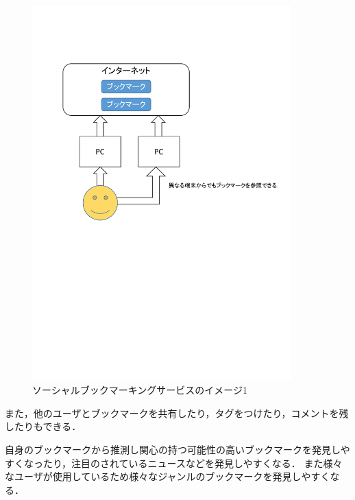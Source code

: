 \begin{figure}[htb]
\centering
\includegraphics[width=10cm]{sbs1.pdf}
\caption{ソーシャルブックマーキングサービスのイメージ1}\label{sbs1}
\end{figure}

\newpage

また，他のユーザとブックマークを共有したり，タグをつけたり，コメントを残したりもできる．\par
自身のブックマークから推測し関心の持つ可能性の高いブックマークを発見しやすくなったり，注目のされているニュースなどを発見しやすくなる．
また様々なユーザが使用しているため様々なジャンルのブックマークを発見しやすくなる．

